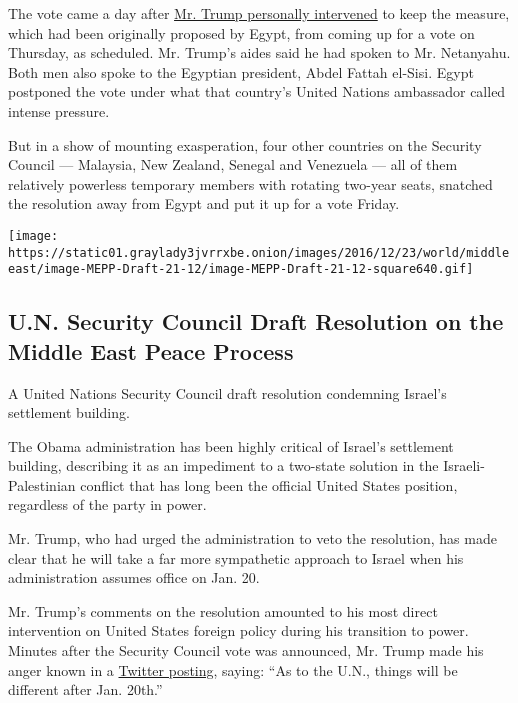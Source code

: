 The vote came a day after
\href{https://www.nytimes3xbfgragh.onion/2016/12/22/world/middleeast/donald-trump-united-nations-israel-settlements.html}{Mr.
Trump personally intervened} to keep the measure, which had been
originally proposed by Egypt, from coming up for a vote on Thursday, as
scheduled. Mr. Trump's aides said he had spoken to Mr. Netanyahu. Both
men also spoke to the Egyptian president, Abdel Fattah el-Sisi. Egypt
postponed the vote under what that country's United Nations ambassador
called intense pressure.

But in a show of mounting exasperation, four other countries on the
Security Council --- Malaysia, New Zealand, Senegal and Venezuela ---
all of them relatively powerless temporary members with rotating
two-year seats, snatched the resolution away from Egypt and put it up
for a vote Friday.

\href{https://www.nytimes3xbfgragh.onion/interactive/2016/12/23/world/middleeast/document-security-council-draft-resolution-israel.html}{}

\texttt{[image: https://static01.graylady3jvrrxbe.onion/images/2016/12/23/world/middleeast/image-MEPP-Draft-21-12/image-MEPP-Draft-21-12-square640.gif]}

\hypertarget{un-security-council-draft-resolution-on-the-middle-east-peace-process}{%
\subsection{U.N. Security Council Draft Resolution on the Middle East
Peace
Process}\label{un-security-council-draft-resolution-on-the-middle-east-peace-process}}

A United Nations Security Council draft resolution condemning Israel's
settlement building.

The Obama administration has been highly critical of Israel's settlement
building, describing it as an impediment to a two-state solution in the
Israeli-Palestinian conflict that has long been the official United
States position, regardless of the party in power.

Mr. Trump, who had urged the administration to veto the resolution, has
made clear that he will take a far more sympathetic approach to Israel
when his administration assumes office on Jan. 20.

Mr. Trump's comments on the resolution amounted to his most direct
intervention on United States foreign policy during his transition to
power. Minutes after the Security Council vote was announced, Mr. Trump
made his anger known in a
\href{https://twitter.com/realDonaldTrump/status/812390964740427776}{Twitter
posting}, saying: ``As to the U.N., things will be different after Jan.
20th.''

